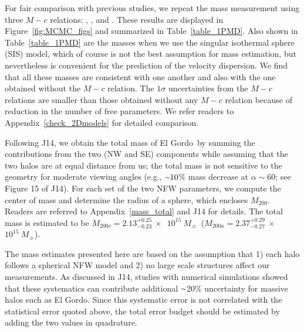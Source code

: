 \documentclass[twocolumn]{aastex631}
\newcommand{\elgordo}{El Gordo}
\newcommand{\mytilde}{\raise.19ex\hbox{$\scriptstyle\sim$}}
\newcommand{\solarmA}{$10^{15}~M_{\sun}$}
\begin{document}
For fair comparison with previous studies, we repeat the mass measurement using three $M-c$ relations: \citet[][D08]{Duffy08}, \citet[][DM14]{DM14}, and \citet[][DJ19]{DJ19}. These results are displayed in Figure~\ref{fig:MCMC_figs} and summarized in Table~\ref{table_1PMD}. 
Also shown in Table~\ref{table_1PMD} are the masses when we use the singular isothermal sphere (SIS) model, which of course is not the best assumption for mass estimation, but nevertheless is convenient for the prediction of the velocity dispersion. 
We find that all these masses are consistent with one another and also with the one obtained without the $M-c$ relation. 
The $1\sigma$ uncertainties from the $M-c$ relations are smaller than those obtained without any $M-c$ relation because of reduction in the number of free parameters. We refer readers to Appendix~\ref{check_2Dmodels} for detailed comparison.


Following J14, we obtain the total mass of \elgordo~by summing the contributions from the two (NW and SE) components while assuming that the two halos are at equal distance from us; the total mass is not sensitive to the geometry for moderate viewing angles (e.g., $\mytilde10$\% mass decrease at $\alpha \sim 60$\degr; see Figure 15 of J14). 
For each set of the two NFW parameters, we compute the center of mass and determine the radius of a sphere, which encloses $M_{200}$. Readers are referred to Appendix~\ref{mass_total} and J14 for details. 
The total mass is estimated to be $M_{200c} = 2.13^{+0.25}_{-0.23}~\times$~\solarmA~($M_{200a} = 2.37^{+0.29}_{-0.27}~\times$~\solarmA).

The mass estimates presented here are based on the assumption that 1) each halo follows a spherical NFW model and 2) no large scale structures affect our measurements. As discussed in J14, studies with numerical simulations showed that these systematics can contribute additional $\mytilde$20\% uncertainty for massive halos such as \elgordo. Since this systematic error is not correlated with the statistical error quoted above, the total error budget should be estimated by adding the two values in quadrature.
\end{document}
